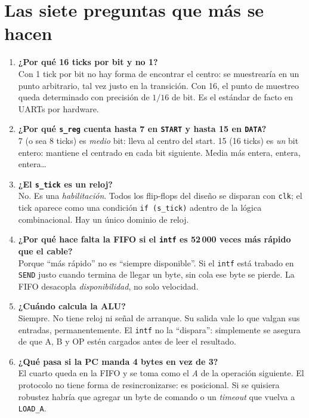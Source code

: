 \documentclass[11pt,a4paper]{article}
\newcommand{\sg}[1]{\texttt{\small #1}}
\begin{document}
\section{Las siete preguntas que m\'as se hacen}

\begin{enumerate}[leftmargin=1.6em, itemsep=7pt]

\item \textbf{¿Por qu\'e 16 ticks por bit y no 1?}\\
Con 1 tick por bit no hay forma de encontrar el centro: se muestrear\'ia en un
punto arbitrario, tal vez justo en la transici\'on. Con 16, el punto de muestreo
queda determinado con precisi\'on de $1/16$ de bit. Es el est\'andar de facto en
UARTs por hardware.

\item \textbf{¿Por qu\'e \sg{s\_reg} cuenta hasta 7 en \sg{START} y hasta 15 en
\sg{DATA}?}\\
7 (o sea 8 ticks) es \emph{medio} bit: lleva al centro del start. 15 (16 ticks) es
\emph{un} bit entero: mantiene el centrado en cada bit siguiente. Media m\'as
entera, entera, entera\dots

\item \textbf{¿El \sg{s\_tick} es un reloj?}\\
No. Es una \emph{habilitaci\'on}. Todos los flip-flops del dise\~no se disparan con
\sg{clk}; el tick aparece como una condici\'on \sg{if (s\_tick)} adentro de la
l\'ogica combinacional. Hay un \'unico dominio de reloj.

\item \textbf{¿Por qu\'e hace falta la FIFO si el \sg{intf} es 52\,000 veces m\'as
r\'apido que el cable?}\\
Porque ``m\'as r\'apido'' no es ``siempre disponible''. Si el \sg{intf} est\'a
trabado en \sg{SEND} justo cuando termina de llegar un byte, sin cola ese byte se
pierde. La FIFO desacopla \emph{disponibilidad}, no solo velocidad.

\item \textbf{¿Cu\'ando calcula la ALU?}\\
Siempre. No tiene reloj ni se\~nal de arranque. Su salida vale lo que valgan sus
entradas, permanentemente. El \sg{intf} no la ``dispara'': simplemente se asegura
de que A, B y OP est\'en cargados antes de leer el resultado.

\item \textbf{¿Qu\'e pasa si la PC manda 4 bytes en vez de 3?}\\
El cuarto queda en la FIFO y se toma como el \emph{A} de la operaci\'on siguiente.
El protocolo no tiene forma de resincronizarse: es posicional. Si se quisiera
robustez habr\'ia que agregar un byte de comando o un \emph{timeout} que vuelva a
\sg{LOAD\_A}.


\end{enumerate}
\end{document}
